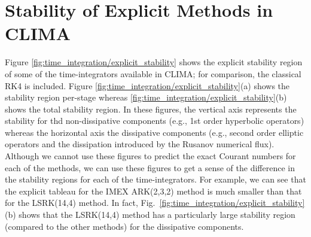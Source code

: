 \documentclass{report}
\numberwithin{equation}{section}
\begin{document}
\section{Stability of Explicit Methods in CLIMA}
Figure \ref{fig:time_integration/explicit_stability} shows the explicit stability region of some of the time-integrators available in CLIMA; for comparison, the classical RK4 is included.  Figure \ref{fig:time_integration/explicit_stability}(a) shows the stability region per-stage whereas \ref{fig:time_integration/explicit_stability}(b) shows the total stability region.  In these figures, the vertical axis represents the stability for thd non-dissipative components (e.g., 1st order hyperbolic operators) whereas the horizontal axis the dissipative components (e.g., second order elliptic operators and the dissipation introduced by the Rusanov numerical flux).  Although we cannot use these figures to predict the exact Courant numbers for each of the methods, we can use these figures to get a sense of the difference in the stability regions for each of the time-integrators. For example, we can see that the explicit tableau for the IMEX ARK(2,3,2) method is much smaller than that for the LSRK(14,4) method. In fact, Fig.\ \ref{fig:time_integration/explicit_stability}(b) shows that the LSRK(14,4) method has a particularly large stability region (compared to the other methods) for the dissipative components.
\end{document}
